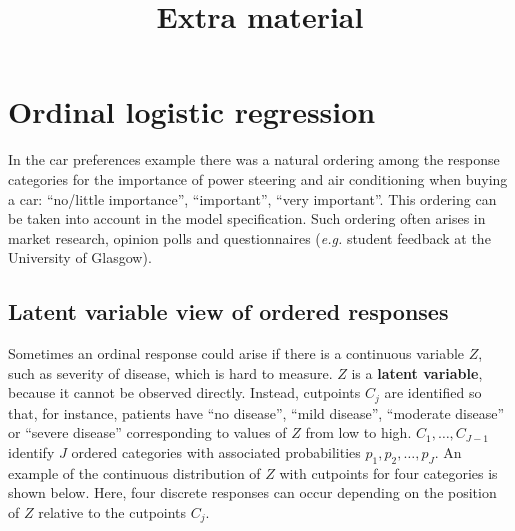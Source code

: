 \documentclass[
  letterpaper,
  DIV=11,
  numbers=noendperiod]{scrartcl}
\title{Extra material}
\author{}
\date{}
\makeatletter
\renewcommand{\maketitle}{\bgroup\setlength{\parindent}{0pt}
\begin{flushleft}
  {\color{uniblue}\sffamily\huge\textbf{\@title}} \vspace{0.3cm} \newline
  {\Large {\@subtitle}} \newline
  \@author
\end{flushleft}\egroup
}
\makeatother
\begin{document}
\maketitle

\pagestyle{mystyle}

\section{Ordinal logistic regression}\label{ordinal-logistic-regression}

In the car preferences example there was a natural ordering among the
response categories for the importance of power steering and air
conditioning when buying a car: ``no/little importance'', ``important'',
``very important''. This ordering can be taken into account in the model
specification. Such ordering often arises in market research, opinion
polls and questionnaires (\emph{e.g.} student feedback at the University
of Glasgow).

\subsection{Latent variable view of ordered
responses}\label{latent-variable-view-of-ordered-responses}

Sometimes an ordinal response could arise if there is a continuous
variable \(Z\), such as severity of disease, which is hard to measure.
\(Z\) is a \textbf{latent variable}, because it cannot be observed
directly. Instead, cutpoints \(C_j\) are identified so that, for
instance, patients have ``no disease'', ``mild disease'', ``moderate
disease'' or ``severe disease'' corresponding to values of \(Z\) from
low to high. \(C_1, \dots, C_{J-1}\) identify \(J\) ordered categories
with associated probabilities \(p_1,p_2,\dots, p_J\). An example of the
continuous distribution of \(Z\) with cutpoints for four categories is
shown below. Here, four discrete responses can occur depending on the
position of \(Z\) relative to the cutpoints \(C_j\).
\end{document}
